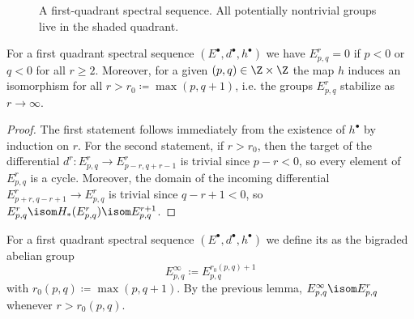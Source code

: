 \documentclass[wip, topology]{bsteffan-lecturenotes}
\begin{document}
\begin{figure}[ht]
	\centering
	\caption{A first-quadrant spectral sequence. All potentially nontrivial groups live in the shaded quadrant.}
\end{figure}
\begin{lemma}
	For a first quadrant spectral sequence $(E^\bullet, d^\bullet, h^\bullet)$ we have $E^r_{p, q} = 0$ if $p < 0$ or $q < 0$ for all $r \geq 2$.
	Moreover, for a given $(p, q) \in \Z \times \Z$ the map $h$ induces an isomorphism for all $r > r_0 \coloneq \max(p, q + 1)$, i.e. the groups $E^r_{p, q}$ stabilize as $r \to \infty$.
\end{lemma}
\begin{proof}
	The first statement follows immediately from the existence of $h^\bullet$ by induction on $r$.
	For the second statement, if $r > r_0$, then the target of the differential $d^r\colon E^r_{p, q} \to E^r_{p - r, q + r - 1}$ is trivial since $p - r < 0$, so every element of $E^r_{p, q}$ is a cycle.
	Moreover, the domain of the incoming differential $E^r_{p + r, q - r + 1} \to E^r_{p, q}$ is trivial since $q - r + 1 < 0$, so $E^r_{p, q} \isom H_*(E^r_{p, q}) \isom E^{r + 1}_{p, q}$.
\end{proof}
\begin{definition}
	For a first quadrant spectral sequence $(E^\bullet, d^\bullet, h^\bullet)$ we define its  as the bigraded abelian group
	\begin{equation*}
		E^\infty_{p, q} \coloneq E^{r_0(p, q) + 1}_{p, q}
	\end{equation*}
	with $r_0(p, q) \coloneq \max(p, q + 1)$.
	By the previous lemma, $E^\infty_{p, q} \isom E^r_{p, q}$ whenever $r > r_0(p, q)$.
\end{definition}
\end{document}

